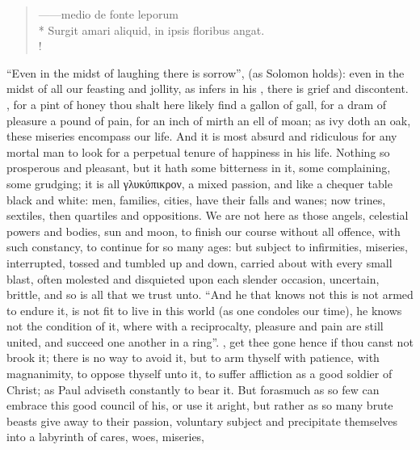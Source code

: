 \begin{latin}
\begin{verse}%
------medio de fonte leporum\\*
Surgit amari aliquid, in ipsis floribus angat.\\!
\end{verse}%
\end{latin}

\enquote{Even in the midst of laughing there is sorrow}, (as
Solomon holds): even in the midst of all our feasting and
jollity, as \Austin infers in his , there is grief and discontent. , for a pint of honey thou shalt here likely find
a gallon of gall, for a dram of pleasure a pound of pain, for an inch of mirth
an ell of moan; as ivy doth an oak, these miseries encompass our life. And it
is most absurd and ridiculous for any mortal man to look for a perpetual tenure
of happiness in his life. Nothing so prosperous and pleasant, but it hath
some bitterness in it, some complaining, some grudging; it
is all \textgreek{γλυκύπικρον}, a mixed passion, and
like a chequer table black and white: men, families, cities, have their falls
and wanes; now trines, sextiles, then quartiles and oppositions. We are not
here as those angels, celestial powers and bodies, sun and moon, to finish our
course without all offence, with such constancy, to continue for so many ages:
but subject to infirmities, miseries, interrupted, tossed and tumbled up and
down, carried about with every small blast, often molested and disquieted upon
each slender occasion, uncertain, brittle, and so is all
that we trust unto. \enquote{And he that knows not this is not
armed to endure it, is not fit to live in this world (as one condoles our
time), he knows not the condition of it, where with a reciprocalty, pleasure
and pain are still united, and succeed one another in a ring}. , get thee gone hence if thou canst not brook it; there is no way to
avoid it, but to arm thyself with patience, with magnanimity, to
oppose thyself unto it, to suffer affliction as a good
soldier of Christ; as Paul adviseth constantly to bear it.
But forasmuch as so few can embrace this good council of his, or use it aright,
but rather as so many brute beasts give away to their passion, voluntary
subject and precipitate themselves into a labyrinth of cares, woes, miseries,

